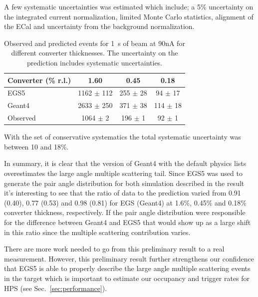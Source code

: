 A few systematic uncertainties was estimated which include; a 5\% uncertainty on the integrated 
current normalization, limited Monte Carlo statistics, alignment of the ECal and uncertainty 
from the background normalization. 
\begin{table}
\begin{tabular}{|l|c|c|c|}
\hline
Converter (\% r.l.) & 1.60 & 0.45 &	0.18 \\
\hline
{\sc EGS5} &	1162 $\pm$ 112 &	255 $\pm$ 28 &	94 $\pm$ 17	\\
\hline
{\sc Geant4} & 2633 $\pm$ 250 & 	371 $\pm$ 38 &	114 $\pm$ 18 \\
\hline
Observed 	& 1064 $\pm$ 2 & 196 $\pm$ 1 &	92 $\pm$ 1 \\						
%						
\hline
\end{tabular}
\caption{ {\small Observed and predicted events for 1~s of beam at 90nA for different converter 
thicknesses. The uncertainty on the prediction includes systematic uncertainties. }}
\label{tab:ang_distr_dataMC}
\end{table}
With the set of conservative systematics the total systematic uncertainty was between 10 and 18\%. 

In summary, it is clear that the version of  
{\sc Geant4} with the default physics lists overestimates the large angle multiple scattering tail. 
Since {\sc EGS5} was used to generate the pair 
angle distribution for both simulation described in the result it's interesting to see that the 
ratio of data to the prediction varied from 0.91 (0.40), 0.77 (0.53) and 0.98 (0.81) for {\sc EGS} 
({\sc Geant4}) at 1.6\%, 0.45\% and 0.18\% converter thickness, respectively. If the pair angle 
distribution were responsible for the difference between {\sc Geant4}  and {\sc EGS5} that would show up as a large shift in this ratio since the multiple scattering contribution varies. 

There are more work needed to go from this preliminary result to a real 
measurement. However, this preliminary result further strengthens our confidence that 
{\sc EGS5} is able to properly describe the large angle multiple scattering events in the target 
which is important to estimate our occupancy and trigger rates for HPS (see Sec.~\ref{sec:performance}).
